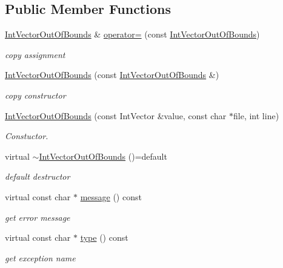 \subsection*{Public Member Functions}
\begin{DoxyCompactItemize}
\item 
\hyperlink{classUintah_1_1PhaseField_1_1IntVectorOutOfBounds}{Int\+Vector\+Out\+Of\+Bounds} \& \hyperlink{classUintah_1_1PhaseField_1_1IntVectorOutOfBounds_a03d63bed9bf7dbe56303d04acdb38709}{operator=} (const \hyperlink{classUintah_1_1PhaseField_1_1IntVectorOutOfBounds}{Int\+Vector\+Out\+Of\+Bounds})
\begin{DoxyCompactList}\small\item\em copy assignment \end{DoxyCompactList}\item 
\hyperlink{classUintah_1_1PhaseField_1_1IntVectorOutOfBounds_a410c299c8c3532eb883c544b079135bf}{Int\+Vector\+Out\+Of\+Bounds} (const \hyperlink{classUintah_1_1PhaseField_1_1IntVectorOutOfBounds}{Int\+Vector\+Out\+Of\+Bounds} \&)
\begin{DoxyCompactList}\small\item\em copy constructor \end{DoxyCompactList}\item 
\hyperlink{classUintah_1_1PhaseField_1_1IntVectorOutOfBounds_a4792e32e153c4a7a86a4c7752b7e0bf3}{Int\+Vector\+Out\+Of\+Bounds} (const Int\+Vector \&value, const char $\ast$file, int line)
\begin{DoxyCompactList}\small\item\em Constuctor. \end{DoxyCompactList}\item 
virtual \hyperlink{classUintah_1_1PhaseField_1_1IntVectorOutOfBounds_aca5643b9b9a1a3f917982795680d63b0}{$\sim$\+Int\+Vector\+Out\+Of\+Bounds} ()=default
\begin{DoxyCompactList}\small\item\em default destructor \end{DoxyCompactList}\item 
virtual const char $\ast$ \hyperlink{classUintah_1_1PhaseField_1_1IntVectorOutOfBounds_a780e8da3f990df0e48009dcb52ce1adc}{message} () const
\begin{DoxyCompactList}\small\item\em get error message \end{DoxyCompactList}\item 
virtual const char $\ast$ \hyperlink{classUintah_1_1PhaseField_1_1IntVectorOutOfBounds_a39e996278db91ce379302f8abe3932ea}{type} () const
\begin{DoxyCompactList}\small\item\em get exception name \end{DoxyCompactList}\end{DoxyCompactItemize}


